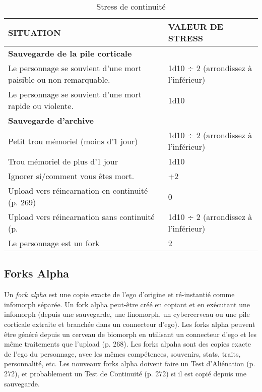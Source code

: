 \begin{table} \caption{Stress de continuité} \begin{tabular}{|l|l|} \hline

SITUATION &VALEUR DE STRESS\\ \hline

\textbf{Sauvegarde de la pile corticale} &\\ \hline

Le personnage se souvient d'une mort paisible ou non remarquable. &1d10 $\div$ 2 (arrondissez à l'inférieur) \\ \hline

Le personnage se souvient d'une mort rapide ou violente. &1d10 \\ \hline

\textbf{Sauvegarde d'archive} &\\ \hline

Petit trou mémoriel (moins d'1 jour) &1d10 $\div$ 2 (arrondissez à l'inférieur) \\ \hline

Trou mémoriel de plus d'1 jour &1d10 \\ \hline

Ignorer si/comment vous êtes mort. &+2 \\ \hline

Upload vers réincarnation en continuité (p. 269) &0 \\ \hline

Upload vers réincarnation sans continuité (p. &1d10 $\div$ 2 (arrondissez à l'inférieur) \\ \hline

Le personnage est un fork &2 \\ \hline

\end{tabular} \label{table:continuity-stress} \end{table} 

\subsection{Forks Alpha} 

Un \textit{fork alpha} est une copie exacte de l'ego d'origine et ré-instantié comme infomorph séparée. Un fork alpha peut-être créé en copiant et en exécutant une infomorph (depuis une sauvegarde, une finomorph, un cybercerveau ou une pile corticale extraite et branchée dans un connecteur d'ego). Les forks alpha peuvent être généré depuis un cerveau de biomorph en utilisant un connecteur d'ego et les même traitements que l'upload (p. 268). Les forks alpaha sont des copies exacte de l'ego du personnage, avec les mêmes compétences, souvenirs, stats, traits, personnalité, etc. Les nouveaux forks alpha doivent faire un Test d'Aliénation (p. 272), et probablement un Test de Continuité (p. 272) si il est copié depuis une sauvegarde. 

